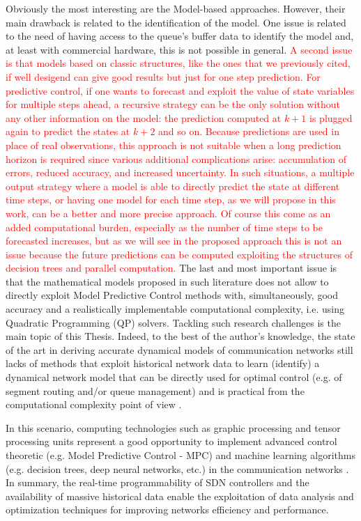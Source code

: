 Obviously the most interesting are the Model-based approaches. However, their main drawback is related to the identification of the model. One issue is related to the need of having access to the queue's buffer data to identify the model and, at least with commercial hardware, this is not possible in general. \textcolor{red}{A second issue is that models based on classic structures, like the ones that we previously cited, if well desigend can give good results but just for one step prediction. For predictive control, if one wants to forecast and exploit the value of state variables for multiple steps ahead, a recursive strategy can be the only solution without any other information on the model: the prediction computed at $k+1$ is plugged again to predict the states at $k+2$ and so on. Because predictions are used in place of real observations, this approach is not suitable when a long prediction horizon is required since various additional complications arise: accumulation of errors, reduced accuracy, and increased uncertainty. In such situations, a multiple output strategy where a model is able to directly predict the state at different time steps, or having one model for each time step, as we will propose in this work, can be a better and more precise approach. Of course this come as an added computational burden, especially as the number of time steps to be forecasted increases, but as we will see in the proposed approach this is not an issue because the future predictions can be computed exploiting the structures of decision trees and parallel computation.}
The last and most important issue is that the mathematical models proposed in such literature does not allow to directly exploit Model Predictive Control methods with, simultaneously, good accuracy and a realistically implementable computational complexity, i.e. using Quadratic Programming (QP) solvers. Tackling such research challenges is the main topic of this Thesis. Indeed, to the best of the author's knowledge, the state of the art in deriving accurate dynamical models of communication networks still lacks of methods that exploit historical network data to learn (identify) a dynamical network model that can be directly used for optimal control (e.g. of segment routing and/or queue management) and is practical from the computational complexity point of view \cite{Neely2010,Lemeshko2019,Kim2019,Aljoby2019,Lebedenko2018,Le2007,SouravGhosh2005}.

In this scenario, computing technologies such as graphic processing and tensor processing units represent a good opportunity to implement advanced control theoretic (e.g. Model Predictive Control - MPC) and machine learning algorithms (e.g. decision trees, deep neural networks, etc.) in the communication networks \cite{Wang2018, Usama2017, Xie2019, Xu2018}. In summary, the real-time programmability of SDN controllers and the availability of massive historical data enable the exploitation of data analysis and optimization techniques for improving networks efficiency and performance.

